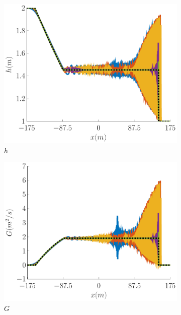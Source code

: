 \documentclass[10pt]{article}
\begin{document}
\begin{figure}
	\centering
	\begin{subfigure}{0.32\textwidth}
		\centering
		\includegraphics[width=\textwidth]{./Figures/Simulations/Study/Serre2SWWECloser/h.pdf}
		\caption{$h$}
	\end{subfigure}
	\begin{subfigure}{0.32\textwidth}
		\centering
		\includegraphics[width=\textwidth]{./Figures/Simulations/Study/Serre2SWWECloser/G.pdf}
		\caption{$G$}
	\end{subfigure}
	\begin{subfigure}{0.32\textwidth}

\end{subfigure}
\end{figure}
\end{document}
